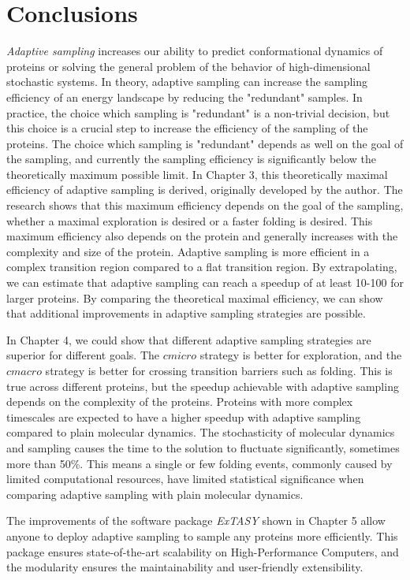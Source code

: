 \afterpage{\null\newpage}
\chapter{Conclusions}
\label{ch:conclude}
\emph{Adaptive sampling} increases our ability to predict conformational dynamics of proteins or solving the general problem of the behavior of high-dimensional stochastic systems. 
In theory, adaptive sampling can increase the sampling efficiency of an energy landscape by reducing the "redundant" samples. In practice, the choice which sampling is "redundant" is a non-trivial decision, but this choice is a crucial step to increase the efficiency of the sampling of the proteins. The choice which sampling is "redundant" depends as well on the goal of the sampling, and currently the sampling efficiency is significantly below the theoretically maximum possible limit. In Chapter 3, this theoretically maximal efficiency of adaptive sampling is derived, originally developed by the author. The research shows that this maximum efficiency depends on the goal of the sampling, whether a maximal exploration is desired or a faster folding is desired. This maximum efficiency also depends on the protein and generally increases with the complexity and size of the protein. Adaptive sampling is more efficient in a complex transition region compared to a flat transition region. By extrapolating, we can estimate that adaptive sampling can reach a speedup of at least 10-100 for larger proteins. By comparing the theoretical maximal efficiency, we can show that additional improvements in adaptive sampling strategies are possible.

In Chapter 4, we could show that different adaptive sampling strategies are superior for different goals. The $cmicro$ strategy is better for exploration, and the $cmacro$ strategy is better for crossing transition barriers such as folding. This is true across different proteins, but the speedup achievable with adaptive sampling depends on the complexity of the proteins. Proteins with more complex timescales are expected to have a higher speedup with adaptive sampling compared to plain molecular dynamics. The stochasticity of molecular dynamics and sampling causes the time to the solution to fluctuate significantly, sometimes more than 50\%. This means a single or few folding events, commonly caused by limited computational resources, have limited statistical significance when comparing adaptive sampling with plain molecular dynamics.

The improvements of the software package \emph{ExTASY} shown in Chapter 5 allow anyone to deploy adaptive sampling to sample any proteins more efficiently. This package ensures state-of-the-art scalability on High-Performance Computers, and the modularity ensures the maintainability and user-friendly extensibility.

